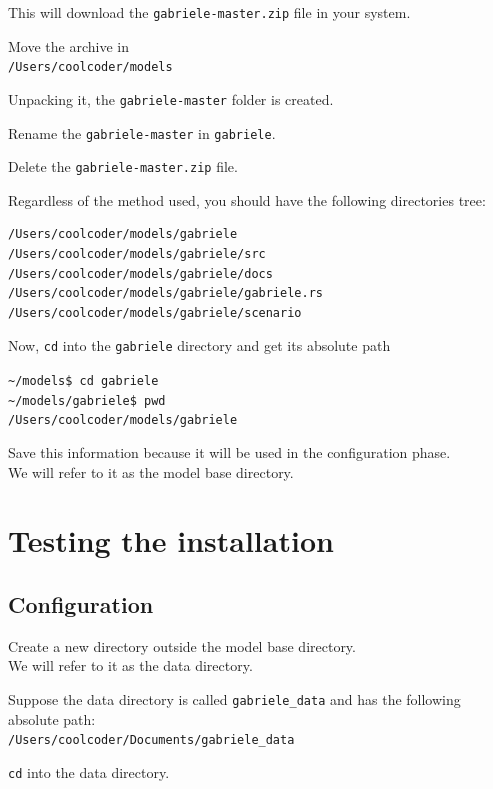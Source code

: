 \documentclass{book}
\begin{document}
This will download the \verb+gabriele-master.zip+ file in your system.

Move the archive in\\
\verb+/Users/coolcoder/models+

Unpacking it, the \verb+gabriele-master+ folder is created.

Rename the \verb+gabriele-master+ in \verb+gabriele+.

Delete the \verb+gabriele-master.zip+ file.

\vskip1cm
Regardless of the method used, you should have the following directories tree: 

\begin{verbatim}
/Users/coolcoder/models/gabriele
/Users/coolcoder/models/gabriele/src
/Users/coolcoder/models/gabriele/docs
/Users/coolcoder/models/gabriele/gabriele.rs
/Users/coolcoder/models/gabriele/scenario
\end{verbatim}

Now, \verb+cd+ into the \verb+gabriele+ directory and get its absolute path  



\vskip2mm
\noindent\verb+~/models$ +\color{red}\verb+cd gabriele+ \color{black}\\
\verb+~/models/gabriele$ +\color{red}\verb+pwd+ \color{blue}\\
\verb+/Users/coolcoder/models/gabriele+
\color{black}
\vskip2mm


Save this information because it will be used in the configuration phase. \\ We will refer to it as the model base directory.

\section{Testing the installation}

\subsection{Configuration}

Create a new directory outside the model base directory. \\ We will refer to it as the data directory.

Suppose the data directory is called \verb+gabriele_data+ and has the following absolute path: \\
\verb+/Users/coolcoder/Documents/gabriele_data+

\verb+cd+ into the data directory.
\end{document}
